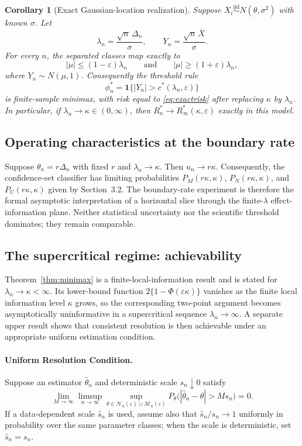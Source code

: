 \documentclass[11pt]{article}
\newtheorem{corollary}{Corollary}
\theoremstyle{remark}
\begin{document}
\begin{corollary}[Exact Gaussian-location realization]
\label{cor:gaussian-finite}
Suppose $X_i\stackrel{\mathrm{iid}}{\sim}N(\theta,\sigma^2)$ with known $\sigma$. Let
\[
\lambda_n=\frac{\sqrt n\,\Delta_n}{\sigma},
\qquad
Y_n=\frac{\sqrt n\,\bar X}{\sigma}.
\]
For every $n$, the separated classes map exactly to
\[
|\mu|\le(1-\varepsilon)\lambda_n
\qquad\text{and}\qquad
|\mu|\ge(1+\varepsilon)\lambda_n,
\]
where $Y_n\sim N(\mu,1)$. Consequently the threshold rule
\[
\phi_n^*=\mathbf1\{|Y_n|>c^*(\lambda_n,\varepsilon)\}
\]
is finite-sample minimax, with risk equal to \eqref{eq:exactrisk} after replacing $\kappa$ by $\lambda_n$. In particular, if $\lambda_n\to\kappa\in(0,\infty)$, then $R_n^*\to R_\infty^*(\kappa,\varepsilon)$ exactly in this model.
\end{corollary}

\subsection{Operating characteristics at the boundary rate}

Suppose $\theta_n=r\Delta_n$ with fixed $r$ and $\lambda_n\to\kappa$. Then $u_n\to r\kappa$. Consequently, the confidence-set classifier has limiting probabilities $P_M(r\kappa,\kappa)$, $P_N(r\kappa,\kappa)$, and $P_U(r\kappa,\kappa)$ given by Section~3.2. The boundary-rate experiment is therefore the formal asymptotic interpretation of a horizontal slice through the finite-$\lambda$ effect-information plane. Neither statistical uncertainty nor the scientific threshold dominates; they remain comparable.

\subsection{The supercritical regime: achievability}

Theorem~\ref{thm:minimax} is a finite-local-information result and is stated for $\lambda_n\to\kappa<\infty$. Its lower-bound function $2\{1-\Phi(\varepsilon\kappa)\}$ vanishes as the finite local information level $\kappa$ grows, so the corresponding two-point argument becomes asymptotically uninformative in a supercritical sequence $\lambda_n\to\infty$. A separate upper result shows that consistent resolution is then achievable under an appropriate uniform estimation condition.

\paragraph{Uniform Resolution Condition.}
Suppose an estimator $\hat\theta_n$ and deterministic scale $s_n\downarrow0$ satisfy
\begin{equation}
\lim_{M\to\infty}\limsup_{n\to\infty}
\sup_{\theta\in\mathcal N_n(\varepsilon)\cup\mathcal M_n(\varepsilon)}
P_\theta\bigl(|\hat\theta_n-\theta|>Ms_n\bigr)=0.
\label{eq:urc}
\end{equation}
If a data-dependent scale $\hat s_n$ is used, assume also that $\hat s_n/s_n\to1$ uniformly in probability over the same parameter classes; when the scale is deterministic, set $\hat s_n=s_n$.
\end{document}
